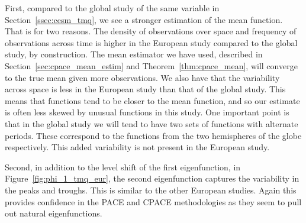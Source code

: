 First, compared to the global study of the same variable in Section~\ref{ssec:cesm_tmq}, we see a stronger estimation of the mean function.
That is for two reasons.
The density of observations over space and frequency of observations across time is higher in the European study compared to the global study, by construction.
The mean estimator we have used, described in Section~\ref{sec:cpace_mean_estim} and Theorem~\ref{thm:cpace_mean}, will converge to the true mean given more observations.
We also have that the variability across space is less in the European study than that of the global study.
This means that functions tend to be closer to the mean function, and so our estimate is often less skewed by unusual functions in this study.
One important point is that in the global study we will tend to have two sets of functions with alternate periods.
These correspond to the functions from the two hemispheres of the globe respectively.
This added variability is not present in the European study.

Second, in addition to the level shift of the first eigenfunction, in Figure~\ref{fig:phi_1_tmq_eur}, the second eigenfunction captures the variability in the peaks and troughs.
This is similar to the other European studies.
Again this provides confidence in the PACE and CPACE methodologies as they seem to pull out natural eigenfunctions.


